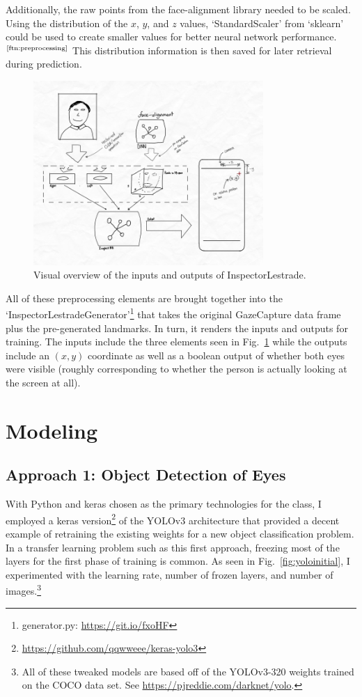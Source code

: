 \documentclass[aip, rsi, amsmath, amssymb, reprint, author-year, longbibliography]{revtex4-1}
\begin{document}
Additionally, the raw points from the face-alignment library
\citep{bulat2017far} needed to be scaled. Using the distribution of the $x$, $y$,
and $z$ values, `StandardScaler' from `sklearn' could be used to create smaller
values for better neural network performance.$^\text{\ref{ftn:preprocessing}}$
This distribution information is then saved for later retrieval during prediction.

\begin{figure}[b]
  \includegraphics[height=7cm]{inspector-lestrade-overview.jpg}
  \caption{\label{fig:overview} Visual overview of the inputs and outputs of InspectorLestrade.}
\end{figure}

All of these preprocessing elements are brought together into the
`InspectorLestradeGenerator'\footnote{generator.py: \url{https://git.io/fxoHF}}
that takes the original GazeCapture data frame plus the pre-generated landmarks.
In turn, it renders the inputs and outputs for training. The inputs include the
three elements seen in Fig.~\ref{fig:overview} while the outputs include an $(x,
y)$ coordinate as well as a boolean output of whether both eyes were visible
(roughly corresponding to whether the person is actually looking at the screen
at all).

\section{\label{sec:level1}Modeling}

\subsection{\label{sec:level2} Approach 1: Object Detection of Eyes}

With Python and keras chosen as the primary technologies for the class, I
employed a keras version\footnote{\url{https://github.com/qqwweee/keras-yolo3}}
of the YOLOv3 architecture that provided a decent example of
retraining the existing weights for a new object classification problem. In a
transfer learning problem such as this first approach, freezing most of the
layers for the first phase of training is common. As seen in
Fig.~\ref{fig:yoloinitial}, I experimented with the learning rate, number of
frozen layers, and number of images.\footnote{All of these tweaked models are
  based off of the YOLOv3-320 weights trained on the COCO data set. See
  \url{https://pjreddie.com/darknet/yolo}.}
\end{document}
